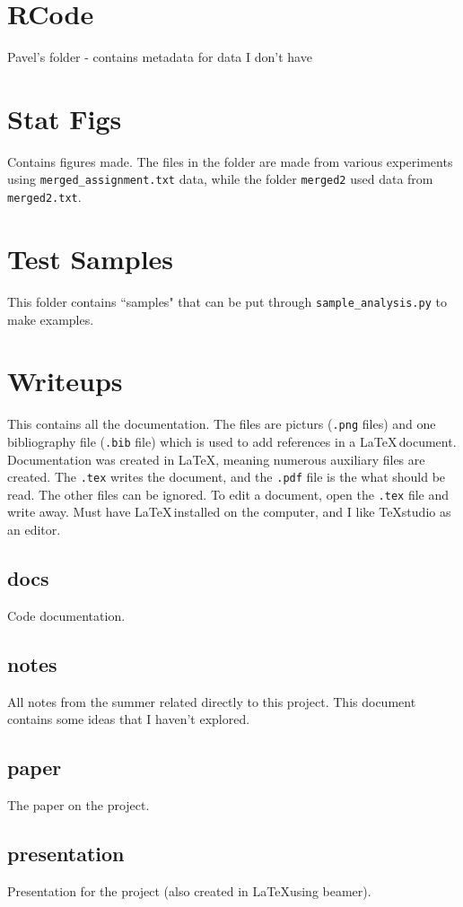 \documentclass[10pt]{article}
\theoremstyle{definition}
\numberwithin{theorem}{section}
\numberwithin{definition}{section}
\numberwithin{lemma}{section}
\numberwithin{corollary}{section}
\numberwithin{clm}{section}
\numberwithin{rmk}{section}
\begin{document}
\section{RCode}
Pavel's folder - contains metadata for data I don't have

\section{Stat Figs}
Contains figures made. The files in the folder are made from various experiments using \verb|merged_assignment.txt| data, while the folder \verb|merged2| used data from \verb|merged2.txt|. 

\section{Test Samples}
This folder contains ``samples" that can be put through \verb|sample_analysis.py| to make examples.

\section{Writeups}
This contains all the documentation. The files are picturs (\verb|.png| files) and one bibliography file (\verb|.bib| file) which is used to add references in a \LaTeX \,document. Documentation was created in \LaTeX, meaning numerous auxiliary files are created. The \verb|.tex| writes the document, and the \verb|.pdf| file is the what should be read. The other files can be ignored. To edit a document, open the \verb|.tex| file and write away. Must have \LaTeX \,installed on the computer, and I like TeXstudio as an editor.

\subsection{docs}
Code documentation. 

\subsection{notes}
All notes from the summer related directly to this project. This document contains some ideas that I haven't explored.

\subsection{paper}
The paper on the project.

\subsection{presentation}
Presentation for the project (also created in \LaTeX using beamer).
\end{document}
